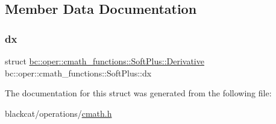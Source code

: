 \subsection{Member Data Documentation}
\mbox{\label{structbc_1_1oper_1_1cmath__functions_1_1SoftPlus_a5e3493e68ebcc9b7bc79a50e4d65f40d}} 
\subsubsection{\texorpdfstring{dx}{dx}}
{\footnotesize\ttfamily struct \hyperlink{structbc_1_1oper_1_1cmath__functions_1_1SoftPlus_1_1Derivative}{bc\+::oper\+::cmath\+\_\+functions\+::\+Soft\+Plus\+::\+Derivative}   bc\+::oper\+::cmath\+\_\+functions\+::\+Soft\+Plus\+::dx}



The documentation for this struct was generated from the following file\+:\begin{DoxyCompactItemize}
\item 
blackcat/operations/\hyperlink{cmath_8h}{cmath.\+h}\end{DoxyCompactItemize}
